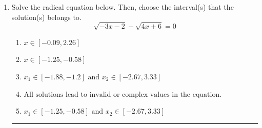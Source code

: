 \documentclass[14pt]{extbook}
\newcommand{\litem}[1]{\item#1\hspace*{-1cm}\rule{\textwidth}{0.4pt}}
\begin{document}
\begin{enumerate}
{\begin{enumerate}[label=\Alph*.]
\end{enumerate} }
\litem{
Solve the radical equation below. Then, choose the interval(s) that the solution(s) belongs to.\[ \sqrt{-3 x - 2} - \sqrt{4 x + 6} = 0 \]\begin{enumerate}[label=\Alph*.]
\item \( x \in [-0.09,2.26] \)
\item \( x \in [-1.25,-0.58] \)
\item \( x_1 \in [-1.88, -1.2] \text{ and } x_2 \in [-2.67,3.33] \)
\item \( \text{All solutions lead to invalid or complex values in the equation.} \)
\item \( x_1 \in [-1.25, -0.58] \text{ and } x_2 \in [-2.67,3.33] \)

\end{enumerate} }
\end{enumerate}
\end{document}
